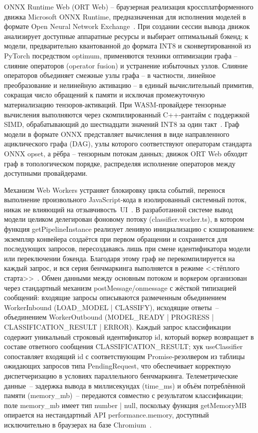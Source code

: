 ONNX Runtime Web (ORT Web) – браузерная реализация кроссплатформенного движка Microsoft ONNX Runtime, предназначенная для исполнения моделей в формате Open Neural Network Exchange~\cite{husom2025sustainable}. При создании сессии вывода движок анализирует доступные аппаратные ресурсы и выбирает оптимальный бэкенд; к модели, предварительно квантованной до формата INT8 и сконвертированной из PyTorch посредством optimum, применяются техники оптимизации графа – слияние операторов (operator fusion) и устранение избыточных узлов. Слияние операторов объединяет смежные узлы графа – в частности, линейное преобразование и нелинейную активацию – в единый вычислительный примитив, сокращая число обращений к памяти и исключая промежуточную материализацию тензоров-активаций. При WASM-провайдере тензорные вычисления выполняются через скомпилированный C++-рантайм с поддержкой SIMD, обрабатывающий до шестнадцати значений INT8 за один такт~\cite{wang2024anatomizing}. Граф модели в формате ONNX представляет вычисления в виде направленного ациклического графа (DAG), узлы которого соответствуют операторам стандарта ONNX opset, а рёбра – тензорным потокам данных; движок ORT Web обходит граф в топологическом порядке, распределяя исполнение операторов между доступными провайдерами.

Механизм Web Workers устраняет блокировку цикла событий, перенося выполнение произвольного JavaScript-кода в изолированный системный поток, никак не влияющий на отзывчивость~UI~\cite{xu2024ondevice}. В разработанной системе вывод модели целиком делегирован фоновому потоку (classifier.worker.ts), в котором функция getPipelineInstance реализует ленивую инициализацию с кэшированием: экземпляр конвейера создаётся при первом обращении и сохраняется для последующих запросов, пересоздаваясь лишь при смене идентификатора модели или переключении бэкенда. Благодаря этому граф не перекомпилируется на каждый запрос, и вся серия бенчмаркинга выполняется в режиме <<тёплого старта>>~\cite{ruan2024webllm}. Обмен данными между основным потоком и воркером организован через стандартный механизм postMessage/onmessage с жёсткой типизацией сообщений: входящие запросы описываются размеченным объединением WorkerInbound (LOAD\_MODEL | CLASSIFY), исходящие ответы~– объединением WorkerOutbound (MODEL\_READY | PROGRESS | CLASSIFICATION\_RESULT | ERROR). Каждый запрос классификации содержит уникальный строковый идентификатор id, который воркер возвращает в составе ответного сообщения CLASSIFICATION\_RESULT; хук useClassifier сопоставляет входящий id с соответствующим Promise-резолвером из таблицы ожидающих запросов типа PendingRequest, что обеспечивает корректную диспетчеризацию в условиях параллельного бенчмаркинга. Телеметрические данные~– задержка вывода в миллисекундах (time\_ms) и объём потреблённой памяти (memory\_mb)~– передаются совместно с результатом классификации; поле memory\_mb имеет тип number | null, поскольку функция getMemoryMB опирается на нестандартный API performance.memory, доступный исключительно в браузерах на базе Chromium~\cite{jia2024empowering}.

